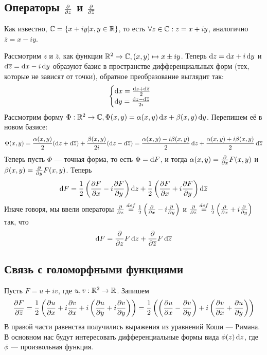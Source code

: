 \documentclass[a4paper]{report}
\begin{document}
    \subsection{Операторы $\der{}{z}$ и $\der{}{\overline{z}}$}
    Как известно, $\C = \defset{x + iy}{x, y \in \R}$, то есть $\forall z \in \C: z = x + iy$, аналогично $\overline{z} = x - iy$.

    Рассмотрим $z$ и $\overline{z}$, как функции $\R^2 \map \C, (x, y) \mapsto x \pm iy$.
    Теперь $\d z = \d x + i \d y$ и $\d \overline{z} = \d x - i \d y$ образуют базис в пространстве дифференциальных форм (тех, которые не зависят от точки), обратное преобразование выглядит так:
    \[\all{\d x = \frac{\d z + \d \overline{z}}{2} \\ \d y = \frac{\d z - \d \overline{z}}{2i}}\]
    Рассмотрим форму $\Phi: \R^2 \map \C, \Phi(x, y) = \alpha(x, y)\d x + \beta(x, y)\d y$.
    Перепишем её в новом базисе:
    \[\Phi(x, y) = \frac{\alpha(x, y)}{2}(\d z + \d \overline{z}) + \frac{\beta(x, y)}{2i}(\d z - \d\overline{z}) = \frac{\alpha(x, y) - i \beta(x, y)}{2}\d z + \frac{\alpha(x, y) + i \beta(x, y)}{2}\d \overline{z}\]
    Теперь пусть $\Phi$ --- точная форма, то есть $\Phi = \d F$, и тогда $\alpha(x, y) = \der{}{x}F(x, y)$ и $\beta(x, y) = \der{}{y}F(x, y)$.
    Теперь
    \[\d F = \frac{1}{2}\left(\der{F}{x} - i\der{F}{y}\right)\d z + \frac{1}{2}\left(\der{F}{x} + i \der{F}{y}\right)\d \overline{z}\]
    Иначе говоря, мы ввели операторы $\der{}{z} \bydef \frac{1}{2}\left(\der{}{x} - i\der{}{y}\right)$ и $\der{}{\overline{z}} \bydef \frac{1}{2}\left(\der{}{x} + i \der{}{y}\right)$ так, что \[\d F = \der{}{z}F\d z + \der{}{\overline{z}}F\d\overline{z}\]
    \subsection{Связь с голоморфными функциями}
    Пусть $F = u + iv$, где $u, v: \R^2 \map \R$.
    Запишем
    \[\der{F}{\overline{z}} = \frac{1}{2}\left(\der{u}{x} + i\der{v}{x} + i\left(\der{u}{y} + i\der{v}{y}\right)\right) = \frac12\left(\left(\der{u}{x} - \der{v}{y}\right) + i\left(\der{v}{x} + \der{u}{y}\right)\right)\]
    В правой части равенства получились выражения из уравнений Коши --- Римана.
    В основном нас будут интересовать дифференциальные формы вида $\phi(z)\d z$, где $\phi$ --- произвольная функция.
\end{document}
